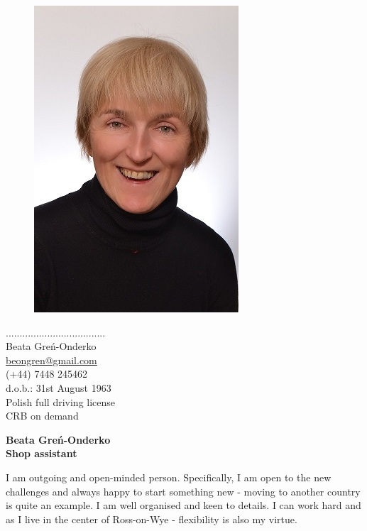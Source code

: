\documentclass[a4paper,12pt,final]{memoir}
\newcommand{\Sep}{\vspace{1.5em}}
\newenvironment{Career Profile}
	{\ignorespaces\textbf{\color{ForestGreen} Career Profile}}
	{\Sep\ignorespacesafterend}
\newenvironment{Key experience}
	{\ignorespaces\textbf{\color{ForestGreen} Key experience}}
	{\Sep\ignorespacesafterend}
\begin{document}
%
\begin{figure}
	\hfill
	\includegraphics{zeby.JPG}
%
	\vspace{-7cm}
\end{figure}

\begin{flushright}
	\small
	\color{White}....................................\\
	\Sep
	\color{Black}
	Beata Greń-Onderko \\
	\url{beongren@gmail.com}  \\
	(+44) 7448 245462\\
	d.o.b.: 31st August 1963\\
	Polish full driving license\\
	CRB on demand
\end{flushright}\normalsize
\framebreak


\Huge\bfseries {\color{ForestGreen} Beata Greń-Onderko} \\
\Large\bfseries  Shop assistant \\

\normalsize\normalfont

\begin{Career Profile} 
I am outgoing and open-minded person. Specifically, I am open to the new challenges and always happy to start something new - moving to another country is quite an example. I am well organised and keen to details. I can work hard and as I live in the center of Ross-on-Wye - flexibility is also my virtue. 
\end{Career Profile}
\end{document}
